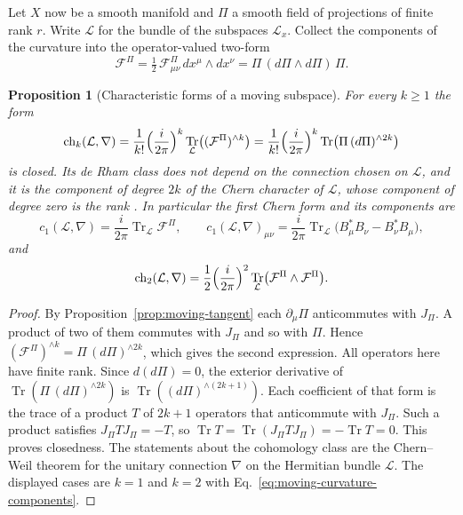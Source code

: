 \documentclass[11pt]{article}
\newtheorem{proposition}{Proposition}[section]
\theoremstyle{definition}
\DeclareMathOperator{\Tr}{Tr}
\begin{document}
Let $X$ now be a smooth manifold and $\Pi$ a smooth field of projections of finite rank $r$. Write $\mathcal L$ for the bundle of the subspaces $\mathcal L_x$. Collect the components of the curvature into the operator-valued two-form
\begin{equation}
 \mathcal F^\Pi=\tfrac12\,\mathcal F^\Pi_{\mu\nu}\,dx^\mu\wedge dx^\nu=\Pi\,(d\Pi\wedge d\Pi)\,\Pi .
 \label{eq:moving-curvature-form}
\end{equation}

\begin{proposition}[Characteristic forms of a moving subspace]
\label{prop:moving-chern}
For every $k\ge1$ the form
\begin{equation}
 \operatorname{ch}_k(\mathcal L,\nabla)
 =\frac1{k!}\Bigl(\frac{i}{2\pi}\Bigr)^k\Tr_{\mathcal L}\bigl((\mathcal F^\Pi)^{\wedge k}\bigr)
 =\frac1{k!}\Bigl(\frac{i}{2\pi}\Bigr)^k\Tr\bigl(\Pi\,(d\Pi)^{\wedge 2k}\bigr)
 \label{eq:moving-chern-character}
\end{equation}
is closed. Its de Rham class does not depend on the connection chosen on $\mathcal L$, and it is the component of degree $2k$ of the Chern character of $\mathcal L$, whose component of degree zero is the rank \cite{KobayashiNomizu,Husemoller}. In particular the first Chern form and its components are
\begin{equation}
 c_1(\mathcal L,\nabla)=\frac{i}{2\pi}\Tr_{\mathcal L}\mathcal F^\Pi,\qquad
 c_1(\mathcal L,\nabla)_{\mu\nu}=\frac{i}{2\pi}\Tr_{\mathcal L}\bigl(B_\mu^*B_\nu-B_\nu^*B_\mu\bigr),
 \label{eq:moving-first-chern}
\end{equation}
and
\begin{equation}
 \operatorname{ch}_2(\mathcal L,\nabla)=\frac12\Bigl(\frac{i}{2\pi}\Bigr)^2\Tr_{\mathcal L}\bigl(\mathcal F^\Pi\wedge\mathcal F^\Pi\bigr).
 \label{eq:moving-second-chern}
\end{equation}
\end{proposition}
\begin{proof}
By Proposition~\ref{prop:moving-tangent} each $\partial_\mu\Pi$ anticommutes with $J_\Pi$. A product of two of them commutes with $J_\Pi$ and so with $\Pi$. Hence $(\mathcal F^\Pi)^{\wedge k}=\Pi\,(d\Pi)^{\wedge 2k}$, which gives the second expression. All operators here have finite rank. Since $d(d\Pi)=0$, the exterior derivative of $\Tr(\Pi\,(d\Pi)^{\wedge 2k})$ is $\Tr((d\Pi)^{\wedge(2k+1)})$. Each coefficient of that form is the trace of a product $T$ of $2k+1$ operators that anticommute with $J_\Pi$. Such a product satisfies $J_\Pi TJ_\Pi=-T$, so $\Tr T=\Tr(J_\Pi TJ_\Pi)=-\Tr T=0$. This proves closedness. The statements about the cohomology class are the Chern--Weil theorem for the unitary connection $\nabla$ on the Hermitian bundle $\mathcal L$. The displayed cases are $k=1$ and $k=2$ with Eq.~\eqref{eq:moving-curvature-components}.
\end{proof}
\end{document}
